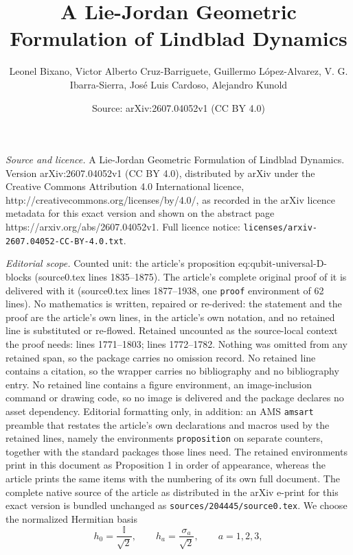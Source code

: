 \documentclass[10pt,a4paper]{amsart}
\title{A Lie-Jordan Geometric Formulation of Lindblad Dynamics}
\author{Leonel Bixano, Victor Alberto Cruz-Barriguete, Guillermo L\'opez-Alvarez, V. G. Ibarra-Sierra, Jos\'e Luis Cardoso, Alejandro Kunold}
\date{Source: arXiv:2607.04052v1 (CC BY 4.0)}
\begin{document}
\maketitle

\noindent\emph{Source and licence.} A Lie-Jordan Geometric Formulation of Lindblad Dynamics. Version arXiv:2607.04052v1 (CC BY 4.0), distributed by arXiv under the Creative Commons Attribution 4.0 International licence, http://creativecommons.org/licenses/by/4.0/, as recorded in the arXiv licence metadata for this exact version and shown on the abstract page https://arxiv.org/abs/2607.04052v1. Full licence notice: \texttt{licenses/arxiv-2607.04052-CC-BY-4.0.txt}.\par\smallskip

\noindent\textit{Editorial scope.} Counted unit: the article's proposition eq:qubit-universal-D-blocks (source0.tex lines 1835--1875). The article's complete original proof of it is delivered with it (source0.tex lines 1877--1938, one \texttt{proof} environment of 62 lines). No mathematics is written, repaired or re-derived: the statement and the proof are the article's own lines, in the article's own notation, and no retained line is substituted or re-flowed.  Retained uncounted as the source-local context the proof needs: lines 1771--1803; lines 1772--1782.  Nothing was omitted from any retained span, so the package carries no omission record.  No retained line contains a citation, so the wrapper carries no bibliography and no bibliography entry.  No retained line contains a figure environment, an image-inclusion command or drawing code, so no image is delivered and the package declares no asset dependency.  Editorial formatting only, in addition: an AMS \texttt{amsart} preamble that restates the article's own declarations and macros used by the retained lines, namely the environments \texttt{proposition} on separate counters, together with the standard packages those lines need.  The retained environments print in this document as Proposition 1 in order of appearance, whereas the article prints the same items with the numbering of its own full document.  The complete native source of the article as distributed in the arXiv e-print for this exact version is bundled unchanged as \texttt{sources/204445/source0.tex}.
We choose the normalized Hermitian basis
\begin{equation}\label{eq:qubit-HS-basis}
    h_0
    =
    \frac{\mathbb I}{\sqrt2},
    \qquad
    h_a
    =
    \frac{\sigma_a}{\sqrt2},
    \qquad
    a=1,2,3,
\end{equation}
\end{document}

